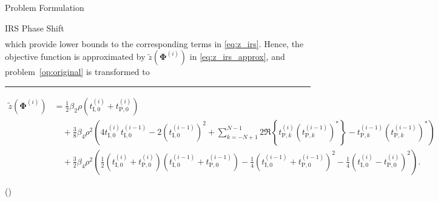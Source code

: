 \documentclass[journal]{IEEEtran}
\begin{document}
\begin{section}{Problem Formulation}
\begin{subsection}{IRS Phase Shift}
\begin{align}
			\end{align}
			which provide lower bounds to the corresponding terms in \eqref{eq:z_irs}. Hence, the objective function is approximated by $\tilde{z}(\boldsymbol{\Phi}^{(i)})$ in \eqref{eq:z_irs_approx}, and problem~\eqref{op:original} is transformed to
			\begin{figure*}[b]
				\hrule
				\begin{align}
					\tilde{z}(\boldsymbol{\Phi}^{(i)})
					& = \frac{1}{2}{\beta_2}{\rho}(t_{\mathrm{I},0}^{(i)}+t_{\mathrm{P},0}^{(i)})\nonumber\\
					& \quad + \frac{3}{8}{\beta_4}{\rho^2} \left(4 t_{\mathrm{I},0}^{(i)}t_{\mathrm{I},0}^{(i-1)} - 2 (t_{\mathrm{I},0}^{(i-1)})^2 + \sum_{k=-N+1}^{N-1}{2 \Re\left\{t_{\mathrm{P},k}^{(i)} (t_{\mathrm{P},k}^{(i-1)})^*\right\} - t_{\mathrm{P},k}^{(i-1)} (t_{\mathrm{P},k}^{(i-1)})^*}\right)\nonumber\\
					& \quad + \frac{3}{2}{\beta_4}{\rho^2} \left(\frac{1}{2}(t_{\mathrm{I},0}^{(i)} + t_{\mathrm{P},0}^{(i)})(t_{\mathrm{I},0}^{(i-1)} + t_{\mathrm{P},0}^{(i-1)}) - \frac{1}{4}(t_{\mathrm{I},0}^{(i-1)} + t_{\mathrm{P},0}^{(i-1)})^2 - \frac{1}{4}(t_{\mathrm{I},0}^{(i)} - t_{\mathrm{P},0}^{(i)})^2\right).\label{eq:z_irs_approx}
				\end{align}
			\end{figure*}
			\begin{maxi!}
				{\boldsymbol{\Phi}}{(\boldsymbol{\Phi})}{\label{op:irs}}{\label{ob:irs}}
				\label{co:irs_rate}
				\label{co:irs_modulus}
			\end{maxi!}

\end{subsection}
\end{section}
\end{document}
